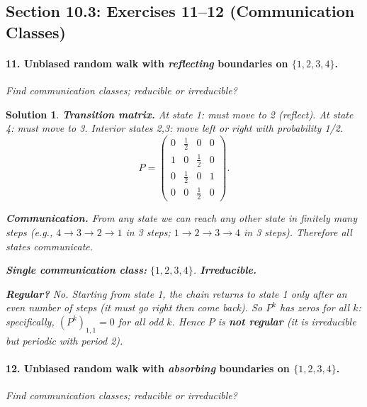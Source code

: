 \documentclass[11pt,a4paper]{article}
\theoremstyle{sol}
\newtheorem*{solution}{Solution}
\begin{document}
\clearpage
\subsection{Section 10.3: Exercises 11--12 (Communication Classes)}

\paragraph{11. Unbiased random walk with \emph{reflecting} boundaries on $\{1,2,3,4\}$.}
\textit{Find communication classes; reducible or irreducible?}

\begin{solution}
\textbf{Transition matrix.} At state 1: must move to 2 (reflect). At state 4: must move to 3. Interior states 2,3: move left or right with probability 1/2.
\[
P = \begin{pmatrix}0&\frac12&0&0\\1&0&\frac12&0\\0&\frac12&0&1\\0&0&\frac12&0\end{pmatrix}.
\]

\textbf{Communication.} From any state we can reach any other state in finitely many steps (e.g., $4\to3\to2\to1$ in 3 steps; $1\to2\to3\to4$ in 3 steps). Therefore all states communicate.

\textbf{Single communication class:} $\{1,2,3,4\}$. \textbf{Irreducible.}

\textbf{Regular?} No. Starting from state 1, the chain returns to state 1 only after an even number of steps (it must go right then come back). So $P^k$ has zeros for all $k$: specifically, $(P^k)_{1,1}=0$ for all odd $k$. Hence $P$ is \textbf{not regular} (it is irreducible but periodic with period 2).
\end{solution}

\paragraph{12. Unbiased random walk with \emph{absorbing} boundaries on $\{1,2,3,4\}$.}
\textit{Find communication classes; reducible or irreducible?}
\end{document}
